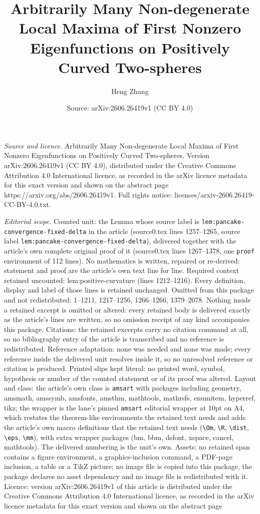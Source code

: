 \documentclass[10pt,a4paper]{amsart}
\title[Arbitrarily Many Non-degenerate Local Maxima of First Nonzer]{Arbitrarily Many Non-degenerate Local Maxima of First Nonzero Eigenfunctions on Positively Curved Two-spheres}
\author{Heng Zhang}
\date{Source: arXiv:2606.26419v1 (CC BY 4.0)}
\begin{document}
\maketitle

\noindent\emph{Source and licence.} Arbitrarily Many Non-degenerate Local Maxima of First Nonzero Eigenfunctions on Positively Curved Two-spheres. Version arXiv:2606.26419v1 (CC BY 4.0), distributed under the Creative Commons Attribution 4.0 International licence, as recorded in the arXiv licence metadata for this exact version and shown on the abstract page https://arxiv.org/abs/2606.26419v1. Full rights notice: licenses/arxiv-2606.26419-CC-BY-4.0.txt.\par\smallskip

\noindent\textit{Editorial scope.} Counted unit: the Lemma whose source label is \texttt{lem:pancake-convergence-fixed-delta} in the article (source0.tex lines 1257--1265, source label \texttt{lem:pancake-convergence-fixed-delta}), delivered together with the article's own complete original proof of it (source0.tex lines 1267--1378, one \texttt{proof} environment of 112 lines). No mathematics is written, repaired or re-derived: statement and proof are the article's own text line for line. Required context retained uncounted: lem:positive-curvature (lines 1212--1216). Every definition, display and label of those lines is retained unchanged. Omitted from this package and not redistributed: 1--1211, 1217--1256, 1266--1266, 1379--2078. Nothing inside a retained excerpt is omitted or altered: every retained body is delivered exactly as the article's lines are written, so no omission receipt of any kind accompanies this package. Citations: the retained excerpts carry no citation command at all, so no bibliography entry of the article is transcribed and no reference is redistributed. Reference adaptation: none was needed and none was made; every reference inside the delivered unit resolves inside it, so no unresolved reference or citation is produced. Printed slips kept literal: no printed word, symbol, hypothesis or number of the counted statement or of its proof was altered. Layout and class: the article's own class is \texttt{amsart} with packages including geometry, amsmath, amssymb, amsfonts, amsthm, mathtools, mathrsfs, enumitem, hyperref, tikz; the wrapper is the lane's pinned \texttt{amsart} editorial wrapper at 10pt on A4, which restates the theorem-like environments the retained text needs and adds the article's own macro definitions that the retained text needs (\texttt{\textbackslash Om}, \texttt{\textbackslash R}, \texttt{\textbackslash dist}, \texttt{\textbackslash eps}, \texttt{\textbackslash mm}), with extra wrapper packages (bm, bbm, dsfont, xspace, cancel, mathtools). The delivered numbering is the unit's own. Assets: no retained span contains a figure environment, a graphics-inclusion command, a PDF-page inclusion, a table or a TikZ picture; no image file is copied into this package, the package declares no asset dependency and no image file is redistributed with it. Licence: version arXiv:2606.26419v1 of this article is distributed under the Creative Commons Attribution 4.0 International licence, as recorded in the arXiv licence metadata for this exact version and shown on the abstract page 
\end{document}
